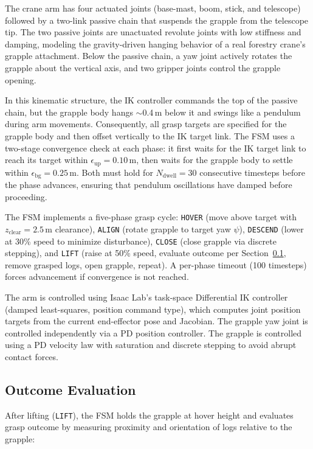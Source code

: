 \documentclass[letterpaper, 10 pt, conference]{ieeeconf}
\begin{document}
The crane arm has four actuated joints (base-mast, boom, stick, and telescope) followed by a two-link passive chain that suspends the grapple from the telescope tip.
The two passive joints are unactuated revolute joints with low stiffness and damping, modeling the gravity-driven hanging behavior of a real forestry crane's grapple attachment.
Below the passive chain, a yaw joint actively rotates the grapple about the vertical axis, and two gripper joints control the grapple opening.

In this kinematic structure, the IK controller commands the top of the passive chain, but the grapple body hangs $\sim$0.4\,m below it and swings like a pendulum during arm movements.
Consequently, all grasp targets are specified for the grapple body and then offset vertically to the IK target link.
The FSM uses a two-stage convergence check at each phase: it first waits for the IK target link to reach its target within $\epsilon_{\text{up}} = 0.10$\,m, then waits for the grapple body to settle within $\epsilon_{\text{bg}} = 0.25$\,m.
Both must hold for $N_{\text{dwell}} = 30$ consecutive timesteps before the phase advances, ensuring that pendulum oscillations have damped before proceeding.

The FSM implements a five-phase grasp cycle: \texttt{HOVER} (move above target with $z_{\text{clear}} = 2.5$\,m clearance), \texttt{ALIGN} (rotate grapple to target yaw $\psi$), \texttt{DESCEND} (lower at 30\% speed to minimize disturbance), \texttt{CLOSE} (close grapple via discrete stepping), and \texttt{LIFT} (raise at 50\% speed, evaluate outcome per Section~\ref{sec:outcome}, remove grasped logs, open grapple, repeat).
A per-phase timeout (100 timesteps) forces advancement if convergence is not reached.

The arm is controlled using Isaac Lab's task-space Differential IK controller~\cite{mittal2023orbit} (damped least-squares, position command type), which computes joint position targets from the current end-effector pose and Jacobian.
The grapple yaw joint is controlled independently via a PD position controller.
The grapple is controlled using a PD velocity law with saturation and discrete stepping to avoid abrupt contact forces.

\subsection{Outcome Evaluation}
\label{sec:outcome}
After lifting (\texttt{LIFT}), the FSM holds the grapple at hover height and evaluates grasp outcome by measuring proximity and orientation of logs relative to the grapple:
\end{document}
